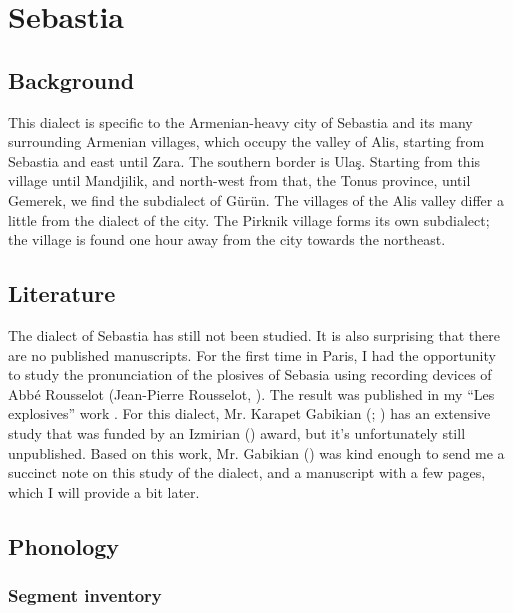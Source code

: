 \chapter{Sebastia } \label{chapter:Sebastia}
\section{Background}

\begin{adjarianpage}\label{page:225}\end{adjarianpage}%


This dialect is specific to the Armenian-heavy city of Sebastia and its many surrounding Armenian villages, which occupy the valley of Alis, starting from Sebastia and east until Zara. The southern border is Ulaş. Starting from this village until Mandjilik, and north-west from that, the Tonus province, until Gemerek, we find the subdialect of Gürün. The villages of the Alis valley differ a little from the dialect of the city. The Pirknik village forms its own subdialect; the village is found one hour away from the city towards the northeast. 

\section{Literature}




The dialect of Sebastia has still not been studied. It is also surprising that there are no published manuscripts. For the first time in Paris, I had the opportunity to study the pronunciation of the plosives of Sebasia using recording devices of Abbé Rousselot (Jean-Pierre Rousselot, ). The result was published in my ``Les explosives'' work \citep{Adjarian-1899-ArmenianExplosives}. For this dialect, Mr. Karapet Gabikian (; ) has an extensive study that was funded by an Izmirian () award, but it's unfortunately still unpublished. Based on this work, Mr. Gabikian () was kind enough to send me a succinct note on this study of the dialect, and a manuscript with a few pages, which I will provide a bit later. 


\section{Phonology}
\subsection{Segment inventory}
